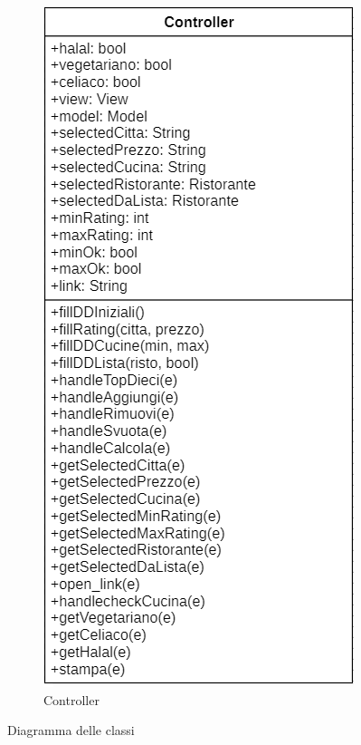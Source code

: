 \documentclass{report}
\begin{document}
\begin{figure}[h!]
{\begin{minipage}{\textwidth}
\begin{subfigure}[h]{0.45\textwidth}
                \includegraphics[width=\textwidth]{images/controller.png}
                \caption{Controller}
                \label{fig:controller}
            \end{subfigure}
        \end{minipage}
    }
    \caption{Diagramma delle classi}
    \label{fig:diagramma}
\end{figure}
\end{document}
